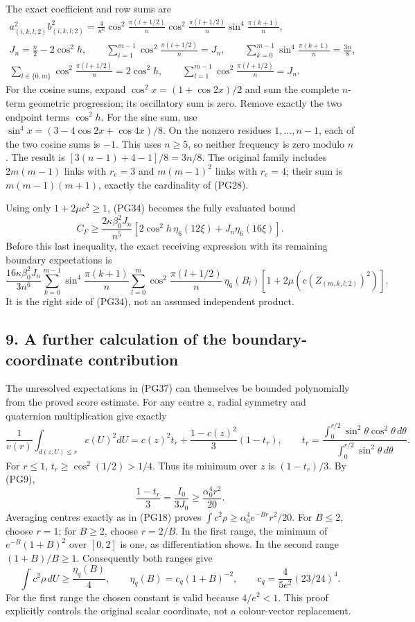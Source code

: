 \documentclass[11pt]{article}
\begin{document}
The exact coefficient and row sums are
\[
 \begin{gathered}
 a_{(i,k,l;2)}^2b_{(i,k,l;2)}^2
 =\frac4{n^6}\cos^2\frac{\pi(i+1/2)}n
       \cos^2\frac{\pi(l+1/2)}n\sin^4\frac{\pi(k+1)}n,\\
 J_n=\frac n2-2\cos^2h,\qquad
 \sum_{i=1}^{m-1}\cos^2\frac{\pi(i+1/2)}n=J_n,\qquad
 \sum_{k=0}^{m-1}\sin^4\frac{\pi(k+1)}n=\frac{3n}{8},\\
 \sum_{l\in\{0,m\}}\cos^2\frac{\pi(l+1/2)}n=2\cos^2h,\qquad
 \sum_{l=1}^{m-1}\cos^2\frac{\pi(l+1/2)}n=J_n .
 \end{gathered}\tag{PG35}
\]
For the cosine sums, expand \(\cos^2x=(1+\cos2x)/2\) and sum
the complete \(n\)-term geometric progression; its oscillatory sum
is zero. Remove exactly the two endpoint terms \(\cos^2h\).
For the sine sum, use
\(\sin^4x=(3-4\cos2x+\cos4x)/8\).
On the nonzero residues \(1,\ldots,n-1\), each of the two cosine
sums is \(-1\). This uses \(n\ge5\), so neither frequency is zero
modulo \(n\). The result is
\([3(n-1)+4-1]/8=3n/8\).
The original family includes \(2m(m-1)\) links with \(r_e=3\)
and \(m(m-1)^2\) links with \(r_e=4\); their sum is
\(m(m-1)(m+1)\), exactly the cardinality of (PG28).

Using only \(1+2\mu c^2\ge1\), (PG34) becomes the fully evaluated
bound
\[
 C_F\ge\frac{2\kappa\beta_0^2J_n}{n^5}
       \left[2\cos^2h\,\eta_6(12\xi)+J_n\eta_6(16\xi)\right].
 \tag{PG36}
\]
Before this last inequality, the exact receiving expression with its
remaining boundary expectations is
\[
 \frac{16\kappa\beta_0^2J_n}{3n^6}
 \sum_{k=0}^{m-1}\sin^4\frac{\pi(k+1)}n
 \sum_{l=0}^{m}\cos^2\frac{\pi(l+1/2)}n\,\eta_6(B_l)
             [1+2\mu(c(Z_{(m,k,l;2)})^2)] .
 \tag{PG37}
\]
It is the right side of (PG34), not an assumed independent product.

\subsection*{9. A further calculation of the boundary-coordinate contribution}

The unresolved expectations in (PG37) can themselves be bounded
polynomially from the proved score estimate. For any centre \(z\),
radial symmetry and quaternion multiplication give exactly
\[
 \frac1{v(r)}\int_{d(z,U)\le r}c(U)^2dU
 =c(z)^2t_r+\frac{1-c(z)^2}{3}(1-t_r),\qquad
 t_r=\frac{\int_0^{r/2}\sin^2\theta\cos^2\theta\,d\theta}
            {\int_0^{r/2}\sin^2\theta\,d\theta}.
 \tag{PG38}
\]
For \(r\le1\), \(t_r\ge\cos^2(1/2)>1/4\).
Thus its minimum over \(z\) is \((1-t_r)/3\). By (PG9),
\[
 \frac{1-t_r}{3}
 =\frac{I_0}{3J_0}
 \ge\frac{\alpha_0^4r^2}{20}.
 \tag{PG39}
\]
Averaging centres exactly as in (PG18) proves
\(\int c^2\rho\ge\alpha_0^4 e^{-Br}r^2/20\).
For \(B\le2\), choose \(r=1\); for \(B\ge2\), choose \(r=2/B\).
In the first range, the minimum of
\(e^{-B}(1+B)^2\) over \([0,2]\) is one, as differentiation
shows. In the second range \((1+B)/B\ge1\).
Consequently both ranges give
\[
 \int c^2\rho\,dU\ge\frac{\eta_q(B)}4,\qquad
 \eta_q(B)=c_q(1+B)^{-2},\qquad
 c_q=\frac4{5e^2}(23/24)^4 .
 \tag{PG40}
\]
For the first range the chosen constant is valid because
\(4/e^2<1\). This proof explicitly controls the original scalar
coordinate, not a colour-vector replacement.
\end{document}
